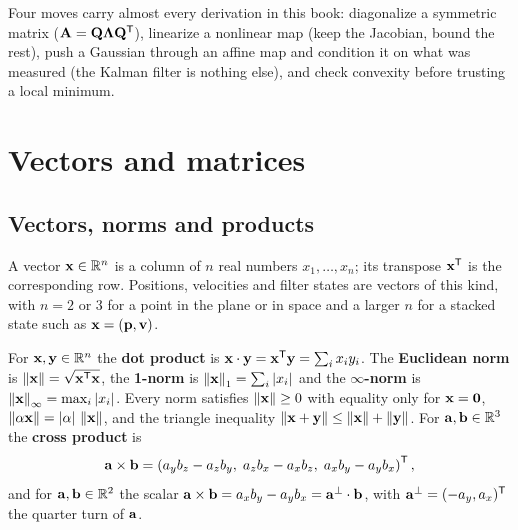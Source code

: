 \begin{keyidea}
Four moves carry almost every derivation in this book: diagonalize a symmetric
matrix ($\mathbf{A} = \mathbf{Q}\mathbf{\Lambda}\mathbf{Q}^{\mathsf{T}}$), linearize a nonlinear map
(keep the Jacobian, bound the rest), push a Gaussian through an affine map and
condition it on what was measured (the Kalman filter is nothing else), and
check convexity before trusting a local minimum.
\end{keyidea}

\section{Vectors and matrices}
\label{sec:appB-linalg}

\subsection{Vectors, norms and products}

A vector $\mathbf{x} \in \mathbb{R}^n$ is a column of $n$ real numbers $x_1, \dots,
x_n$; its transpose $\mathbf{x}^{\mathsf{T}}$ is the corresponding row. Positions,
velocities and filter states are vectors of this kind, with $n = 2$ or $3$ for
a point in the plane or in space and a larger $n$ for a stacked state such as
$\mathbf{x} = (\mathbf{p}, \mathbf{v})$.

\begin{definition}
\label{def:appB-norm}
For $\mathbf{x}, \mathbf{y} \in \mathbb{R}^n$ the \textbf{dot product}
is $\mathbf{x} \cdot \mathbf{y} = \mathbf{x}^{\mathsf{T}} \mathbf{y} = \sum_i x_i y_i$. The
\textbf{Euclidean norm} is $\left\lVert \mathbf{x} \right\rVert =
\sqrt{\mathbf{x}^{\mathsf{T}}\mathbf{x}}$, the \textbf{1-norm} is $\left\lVert \mathbf{x} \right\rVert_1 = \sum_i
\left\lvert x_i \right\rvert$ and the \textbf{$\infty$-norm} is $\left\lVert \mathbf{x} \right\rVert_\infty = \max_i
\left\lvert x_i \right\rvert$. Every norm satisfies
$\left\lVert \mathbf{x} \right\rVert \ge 0$ with equality only for $\mathbf{x} = \mathbf{0}$,
$\left\lVert \alpha \mathbf{x} \right\rVert = \left\lvert \alpha \right\rvert\,\left\lVert \mathbf{x} \right\rVert$, and the triangle
inequality $\left\lVert \mathbf{x} + \mathbf{y} \right\rVert \le \left\lVert \mathbf{x} \right\rVert + \left\lVert \mathbf{y} \right\rVert$.
For $\mathbf{a}, \mathbf{b} \in \mathbb{R}^3$ the \textbf{cross product}
is
\begin{equation}
  \mathbf{a} \times \mathbf{b} = \left( a_y b_z - a_z b_y,\; a_z b_x - a_x b_z,\; a_x b_y - a_y b_x \right)^{\mathsf{T}} ,
  \label{eq:appB-cross}
\end{equation}
and for $\mathbf{a}, \mathbf{b} \in \mathbb{R}^2$ the scalar $\mathbf{a} \times \mathbf{b} =
a_x b_y - a_y b_x = \mathbf{a}^{\perp} \cdot \mathbf{b}$, with $\mathbf{a}^{\perp} =
(-a_y, a_x)^{\mathsf{T}}$ the quarter turn of $\mathbf{a}$.
\end{definition}

